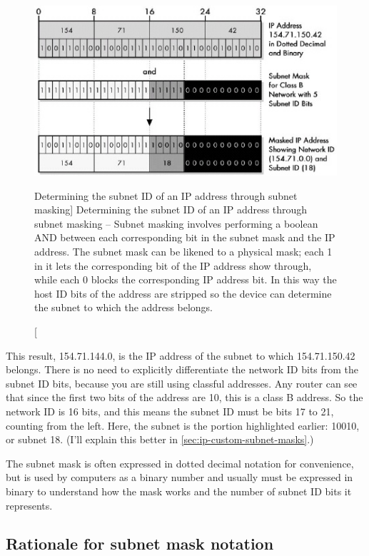 \begin{figure}
   \centering
   \includegraphics[width=.7\textwidth]{images/determining-prefix.jpg}
   \caption
      [Determining the subnet ID of an IP address through subnet masking]
      {Determining the subnet ID of an IP address through subnet masking -- Subnet masking involves performing a boolean AND between each
      corresponding bit in the subnet mask and the IP address.
      The subnet mask can be likened to a physical mask; each 1 in it lets the corresponding bit of the IP address show through, while each 0 blocks the
      corresponding IP address bit.
      In this way the host ID bits of the address are stripped so the device can determine the subnet to which the address belongs.}
   \label{fig:determining-prefix}
\end{figure}


This result, 154.71.144.0, is the IP address of the subnet to which 154.71.150.42 belongs.
There is no need to explicitly differentiate the network ID bits from the subnet ID bits, because you are still using classful addresses.
Any router can see that since the first two bits of the address are 10, this is a class B address.
So the network ID is 16 bits, and this means the subnet ID must be bits 17 to 21, counting from the left.
Here, the subnet is the portion highlighted earlier: 10010, or subnet 18.
(I'll explain this better in \vref{sec:ip-custom-subnet-masks}.)


\begin{keyconcept}
The subnet mask is often expressed in dotted decimal notation for convenience, but is used by computers as a binary
number and usually must be expressed in binary to understand how the mask works and the number of subnet ID bits it represents.
\end{keyconcept}


\subsection{Rationale for subnet mask notation}


